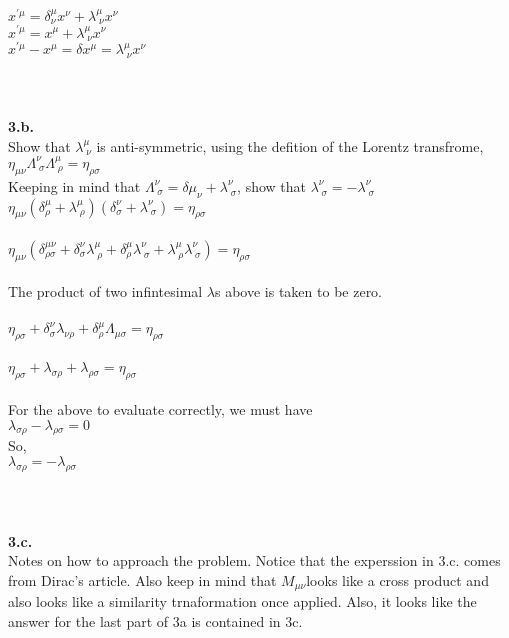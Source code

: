 \documentclass[prb,preprint]
{revtex4-1}
\newcommand{\PRLsep}{\noindent\makebox[\linewidth]{\resizebox{0.8888\linewidth}{2pt}{$\bullet$}}\bigskip}
\begin{document}
\\
$x^{\prime\mu} = \delta^\mu_\nu x^\nu + \lambda^\mu_{\;\nu}x^\nu $
\\
$x^{\prime\mu} = x^\mu + \lambda^\mu_{\;\nu}x^\nu $
\\
$x^{\prime\mu} - x^\mu = \delta x^\mu = \lambda^\mu_{\;\nu}x^\nu $
\\
\\
\PRLsep
\\
\\
\newpage
\textbf{3.b.}
\\
Show that $\lambda^\mu_{\;\nu}$ is anti-symmetric, using the defition of the Lorentz transfrome, $\eta_{\mu\nu} \Lambda^\nu_{\;\sigma}\Lambda^\mu_{\;\rho} = \eta_{\rho\sigma}$
\\
Keeping in mind that $\Lambda^\nu_{\;\sigma} = \delta\mu_\nu + \lambda^\nu_{\;\sigma}$, show that $\lambda^\nu_{\;\sigma} = -\lambda^\nu_{\;\sigma}$
\\
$\eta_{\mu\nu}\left(\delta^\mu_\rho+ \lambda^\mu_{\;\rho}\right)\left(\delta^\nu_\sigma + \lambda^\nu_{\;\sigma}\right) = \eta_{\rho\sigma}$
\\
\\
$\eta_{\mu\nu}\left(\delta^{\mu\nu}_{\rho\sigma} + \delta^\nu_\sigma \lambda^\mu_{\;\rho} + \delta^\mu_\rho \lambda^\nu_{\;\sigma} + \lambda^\mu_{\;\rho}\lambda^\nu_{\;\sigma}\right) = \eta_{\rho\sigma}$
\\
\\
The product of two infintesimal $\lambda$s above is taken to be zero.
\\
\\
$\eta_{\rho\sigma} + \delta^\nu_\sigma \lambda_{\nu\rho} + \delta^\mu_\rho\Lambda_{\mu\sigma} = \eta_{\rho\sigma}$
\\
\\
$\eta_{\rho\sigma} + \lambda_{\sigma\rho} + \lambda_{\rho\sigma} = \eta_{\rho\sigma}$
\\
\\
For the above to evaluate correctly, we must have 
\\
$\lambda_{\sigma\rho} - \lambda_{\rho\sigma} = 0$
\\
So, 
\\
$\lambda_{\sigma\rho} = -\lambda_{\rho\sigma}$
\\
\\
\PRLsep
\\
\\
\newpage
\textbf{3.c.}
\\
Notes on how to approach the problem.  Notice that the experssion in 3.c. comes from Dirac's article.  Also keep in mind that $M_{\mu\nu}$looks like a cross product and also looks like a similarity trnaformation once applied.  Also, it looks like the answer for the last part of 3a is contained in 3c. 
\end{document}
